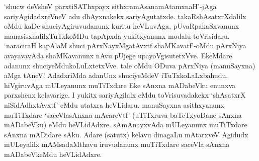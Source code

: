 `shucw deVsheV parxtiSAThxpayx sithxramAsanamAtamxnaH'-jAga sariyAgidadxreVneV adu dhAyxnakekx sariyAgutatxde. takaRshAsatxrXdalilx oMdu kaDe shuciyAgiruvudanunx kuritu heVLuvAga, pUvaRpakaSxvanunx manasisxnalilxTuTxkoMDu tapApxda yukitxyanunx modalu toVrisidaru. `naraciraH kapAlaM shuci pArxNayxMgatAvxtf shaMKavatf'-oMdu pArxNiya avayavavAda shaMKavanunx nAvu pUjege upayoVgisutetxVve. EkeMdare adanunx shuciyeMdukoLuLxtetxVve. tale oMdu ODuva pArxNiya (manuSayxna) aMga tAneV! AdadxriMda adanUnx shuciyeMdeV iTuTxkoLaLxbahudu. hiVgiruvAga mULeyanunx muTiTxdare Eke sAnxna mADabeVku enunxva parxshenx kelavarige. I yukitx sariyAgilalx eMdu toVrisuvadakekx `shAsatxrX niSidAdhxtAvxtf' eMdu utatxra heVLidaru. manuSayxna asithxyanunx muTiTxdare `saceVlasAnxna mAcareVtf' (uTiTxruva baTeTxyoDane sAnxna mADabeVku) eMdu heVLidAdxre. sAmAnayxvAda mULeyanunx muTiTxdare sAnxna mADidare sAku. Adare (satutx) kelavu dinagaLu mAtarxveV Agidudx mULeyalilx mAMsadaMthavu iruvudanunx muTiTxdare saceVla sAnxna mADabeVkeMdu heVLidAdxre.

